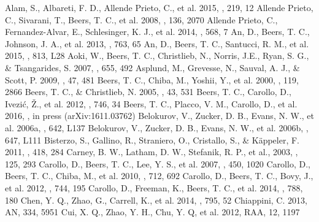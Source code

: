 \documentclass[iop]{emulateapj}
\begin{document}
\begin{thebibliography}{123456789}
 Alam, S., Albareti, F. D., Allende Prieto, C., et al. 2015, \apjs, 219, 12
 Allende Prieto, C., Sivarani, T., Beers, T. C., et al. 2008, \aj, 136, 2070
 Allende Prieto, C., Fernandez-Alvar, E., Schlesinger, K. J., et al. 2014, \aap, 568, 7
 An, D., Beers, T. C., Johnson, J. A., et al. 2013, \apj, 763, 65
 An, D., Beers, T. C., Santucci, R. M., et al. 2015, \apjl, 813, L28
 Aoki, W., Beers, T. C., Christlieb, N., Norris, J.E., Ryan, S. G., \& Tsangarides, S. 2007, \apj, 655, 492
 Asplund, M., Grevesse, N., Sauval, A. J., \& Scott, P. 2009, \araa, 47, 481
 Beers, T. C., Chiba, M., Yoshii, Y., et al. 2000, \aj, 119, 2866
 Beers, T. C., \& Christlieb, N. 2005, \araa, 43, 531
 Beers, T. C., Carollo, D., Ivezi\'c, \v Z., et al. 2012, \apj, 746, 34
 Beers, T. C., Placco, V. M., Carollo, D., et al. 2016, \apj, in press (arXiv:1611.03762)
 Belokurov, V., Zucker, D. B., Evans, N. W., et al. 2006a, \apjl, 642, L137
 Belokurov, V., Zucker, D. B., Evans, N. W., et al. 2006b, \apjl, 647, L111
 Bisterzo, S., Gallino, R., Straniero, O., Cristallo, S., \& K\"appeler, F. 2011, \mnras, 418, 284
 Carney, B. W., Latham, D. W., Stefanik, R. P., et al., 2003, \aj, 125, 293
 Carollo, D., Beers, T. C., Lee, Y. S., et al. 2007, \nat, 450, 1020
 Carollo, D., Beers, T. C., Chiba, M., et al. 2010, \apj, 712, 692
 Carollo, D., Beers, T. C., Bovy, J., et al. 2012, \apj, 744, 195
 Carollo, D., Freeman, K., Beers, T. C., et al. 2014, \apj, 788, 180
 Chen, Y. Q., Zhao, G., Carrell, K., et al. 2014, \apj, 795, 52
 Chiappini, C. 2013, AN, 334, 5951
 Cui, X. Q., Zhao, Y. H., Chu, Y. Q, et al. 2012, RAA, 12, 1197

\end{thebibliography}
\end{document}
